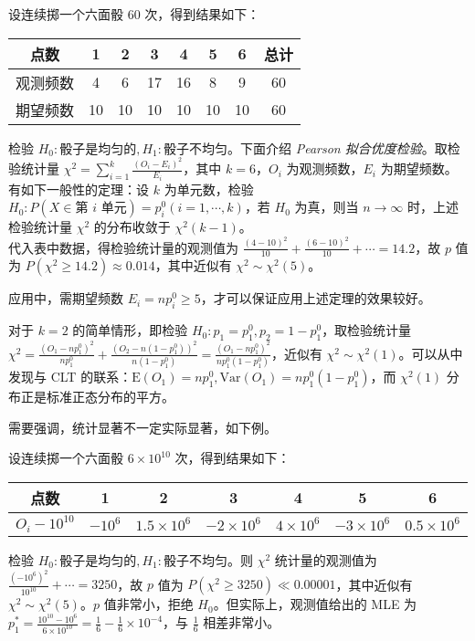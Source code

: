 \documentclass[../main.tex]{subfiles}
\begin{document}
\begin{example}
    设连续掷一个六面骰 $60$ 次，得到结果如下：

    \bigskip
    \begin{tabular}{|c|c|c|c|c|c|c|c|}
        \hline
        点数     & 1  & 2  & 3  & 4  & 5  & 6  & 总计 \\
        \hline
        观测频数 & 4  & 6  & 17 & 16 & 8  & 9  & 60   \\
        \hline
        期望频数 & 10 & 10 & 10 & 10 & 10 & 10 & 60   \\
        \hline
    \end{tabular}
    \bigskip

    \noindent 检验 $H_0:\text{骰子是均匀的},H_1:\text{骰子不均匀}$。下面介绍 \emph{Pearson 拟合优度检验}。取检验统计量 $\chi^2=\sum_{i=1}^k\frac{(O_i-E_i)^2}{E_i}$，其中 $k=6$，$O_i$ 为观测频数，$E_i$ 为期望频数。\\
    有如下一般性的定理：设 $k$ 为单元数，检验 $H_0:P(X\in\text{第 $i$ 单元})=p_i^0(i=1,\cdots,k)$，若 $H_0$ 为真，则当 $n\rightarrow\infty$ 时，上述检验统计量 $\chi^2$ 的分布收敛于 $\chi^2(k-1)$。\\
    代入表中数据，得检验统计量的观测值为 $\frac{(4-10)^2}{10}+\frac{(6-10)^2}{10}+\cdots=14.2$，故 $p$ 值为 $P(\chi^2\geq14.2)\approx0.014$，其中近似有 $\chi^2\sim\chi^2(5)$。
\end{example}

应用中，需期望频数 $E_i=np_i^0\geq 5$，才可以保证应用上述定理的效果较好。

\begin{example}
    对于 $k=2$ 的简单情形，即检验 $H_0:p_1=p_1^0,p_2=1-p_1^0$，取检验统计量 $\chi^2=\frac{(O_1-np_1^0)^2}{np_1^0}+\frac{(O_2-n(1-p_1^0))^2}{n(1-p_1^0)}=\frac{(O_1-np_1^0)^2}{np_1^0(1-p_1^0)}$，近似有 $\chi^2\sim\chi^2(1)$。可以从中发现与 CLT 的联系：$\mathrm E(O_1)=np_1^0,\mathrm{Var}(O_1)=np_1^0(1-p_1^0)$，而 $\chi^2(1)$ 分布正是标准正态分布的平方。
\end{example}

需要强调，统计显著不一定实际显著，如下例。

\begin{example}
    设连续掷一个六面骰 $6\times10^{10}$ 次，得到结果如下：

    \bigskip
    \begin{tabular}{|c|c|c|c|c|c|c|}
        \hline
        点数          & 1       & 2               & 3              & 4             & 5              & 6               \\
        \hline
        $O_i-10^{10}$ & $-10^6$ & $1.5\times10^6$ & $-2\times10^6$ & $4\times10^6$ & $-3\times10^6$ & $0.5\times10^6$ \\
        \hline
    \end{tabular}
    \bigskip

    \noindent 检验 $H_0:\text{骰子是均匀的},H_1:\text{骰子不均匀}$。则 $\chi^2$ 统计量的观测值为 $\frac{(-10^6)^2}{10^{10}}+\cdots=3250$，故 $p$ 值为 $P(\chi^2\geq3250)\ll0.00001$，其中近似有 $\chi^2\sim\chi^2(5)$。$p$ 值非常小，拒绝 $H_0$。但实际上，观测值给出的 MLE 为 $p_1^*=\frac{10^{10}-10^6}{6\times10^{10}}=\frac16-\frac16\times10^{-4}$，与 $\frac16$ 相差非常小。
\end{example}
\end{document}
